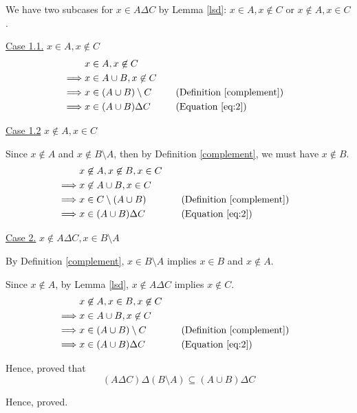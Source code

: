 \begin{enumerate}
\begin{named}[Part 2]
			We have two subcases for $x \in A \Delta C$ by Lemma \ref{lsd}: $x \in A, x \not\in C$ or $x \not\in A, x \in C$.

			\underline{Case 1.1.} $x \in A, x \not\in C$
			\begin{align*}
				& x \in A, x \not\in C \\
				\implies & x \in A \cup B, x \not\in C \\
				\implies & x \in (A \cup B) \setminus C
								 && \quad \text{(Definition \ref{complement})} \\
				\implies & x \in (A \cup B) \Delta C
								 && \quad \text{(Equation \ref{eq:2})}
			\end{align*}

			\underline{Case 1.2} $x \not\in A, x \in C$

			Since $x \not\in A$ and $x \not\in B \setminus A$, then by Definition \ref{complement}, we must have $x \not\in B$.
			\begin{align*}
				& x \not\in A, x \not\in B, x \in C \\
				\implies & x \not\in A \cup B, x \in C \\
				\implies & x \in C \setminus (A \cup B)
								 && \quad \text{(Definition \ref{complement})} \\
				\implies & x \in (A \cup B) \Delta C
								 && \quad \text{(Equation \ref{eq:2})}
			\end{align*}

			\underline{Case 2.} $x \not\in A \Delta C, x \in B \setminus A$

			By Definition \ref{complement}, $x \in B \setminus A$ implies $x \in B$ and $x \not\in A$.

			Since $x \not\in A$, by Lemma \ref{lsd}, $x \not\in A \Delta C$ implies $x \not\in C$.
			\begin{align*}
				& x \not\in A, x \in B, x \not\in C \\
				\implies & x \in A \cup B, x \not\in C \\
				\implies & x \in (A \cup B) \setminus C
								 && \quad \text{(Definition \ref{complement})} \\
				\implies & x \in (A \cup B) \Delta C
								 && \quad \text{(Equation \ref{eq:2})}
			\end{align*}

			Hence, proved that $$(A \Delta C) \Delta (B \setminus A) \subseteq (A \cup B) \Delta C$$
		\end{named}
		Hence, proved.
		\es


\end{enumerate}
